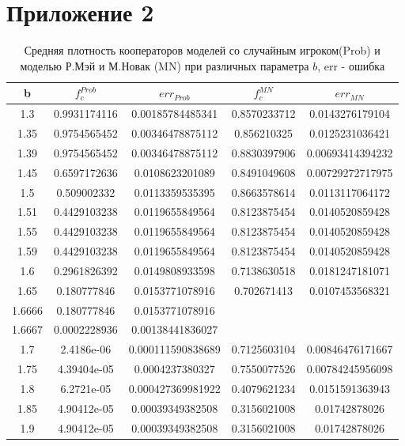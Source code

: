 \documentclass[12pt,a4paper]{article}
\begin{document}
 \section{Приложение 2}
 
 	\begin{center}
 		\begin{table}[H]
 			\centering
 			\begin{tabular}[H]{|c|c|c|c|c|}
 				\hline 
 				b&$f^{Prob}_{c}$& $err_{Prob}$&$f^{MN}_{c}$& $err_{MN}$ \\
 				\hline
 				1.3&0.9931174116&0.00185784485341&0.8570233712&0.0143276179104 \\ 
 				\hline 
 				1.35&0.9754565452&0.00346478875112&0.856210325&0.0125231036421 \\ 
 				\hline 
 				1.39&0.9754565452&0.00346478875112&0.8830397906&0.00693414394232 \\ 
 				\hline 
 				1.45&0.6597172636&0.0108623201089&0.8491049608&0.00729272717975 \\ 
 				\hline 
 				1.5&0.509002332&0.0113359535395&0.8663578614&0.0113117064172 \\ 
 				\hline 
 				1.51&0.4429103238&0.0119655849564&0.8123875454&0.0140520859428 \\ 
 				\hline 
 				1.55&0.4429103238&0.0119655849564&0.8123875454&0.0140520859428 \\ 
 				\hline 
 				1.59&0.4429103238&0.0119655849564&0.8123875454&0.0140520859428 \\ 
 				\hline 
 				1.6&0.2961826392&0.0149808933598&0.7138630518&0.0181247181071 \\ 
 				\hline 
 				1.65&0.180777846&0.0153771078916&0.702671413&0.0107453568321 \\ 
 				\hline 
 				1.6666&0.180777846&0.0153771078916&& \\ 
 				\hline 
 				1.6667&0.0002228936&0.00138441836027&& \\ 
 				\hline 
 				1.7&2.4186e-06&0.000111590838689&0.7125603104&0.00846476171667 \\ 
 				\hline 
 				1.75&4.39404e-05&0.0004237380327&0.7550077526&0.00784245956098 \\ 
 				\hline 
 				1.8&6.2721e-05&0.000427369981922&0.4079621234&0.0151591363943 \\ 
 				\hline 
 				1.85&4.90412e-05&0.00039349382508&0.3156021008&0.01742878026 \\ 
 				\hline 
 				1.9&4.90412e-05&0.00039349382508&0.3156021008&0.01742878026 \\
 				\hline		
 			\end{tabular}
 			\label{tab1}
 			\caption{Средняя плотность кооператоров моделей со случайным игроком(Prob) и моделью Р.Мэй и М.Новак (MN) при различных параметра $b$, err - ошибка}
 		\end{table}
 	\end{center}
 
\end{document}
